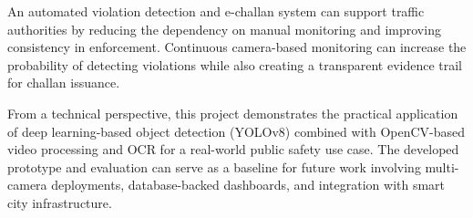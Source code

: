 An automated violation detection and e-challan system can support traffic authorities by reducing the dependency on manual monitoring and improving consistency in enforcement. Continuous camera-based monitoring can increase the probability of detecting violations while also creating a transparent evidence trail for challan issuance.

From a technical perspective, this project demonstrates the practical application of deep learning-based object detection (YOLOv8) combined with OpenCV-based video processing and OCR for a real-world public safety use case. The developed prototype and evaluation can serve as a baseline for future work involving multi-camera deployments, database-backed dashboards, and integration with smart city infrastructure.
